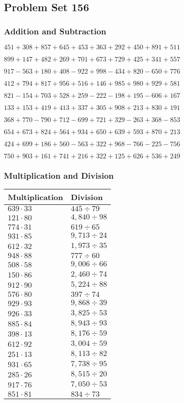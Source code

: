 \hypertarget{problem-set-156}{%
\subsection{Problem Set 156}\label{problem-set-156}}

\hypertarget{addition-and-subtraction}{%
\subsubsection{Addition and
Subtraction}\label{addition-and-subtraction}}

\(451 +308 +857 +645 +453 +363 +292 +450 +891 +511\)

\(899 +147 +482 +269 +701 +673 +729 +425 +341 +557\)

\(917 - 563 +180 +408 - 922 +998 - 434 +820 - 650 +776\)

\(412 +794 +817 +956 +516 +146 +985 +980 +929 +581\)

\(821 - 154 +703 +528 +259 - 222 - 198 +195 - 606 +167\)

\(133 +153 +419 +413 +337 +305 +908 +213 +830 +191\)

\(368 +770 - 790 +712 - 699 +721 +329 - 263 +368 - 853\)

\(654 +673 +824 +564 +934 +650 +639 +593 +870 +213\)

\(424 +699 +186 +560 - 563 +322 +968 - 766 - 225 - 756\)

\(750 +903 +161 +741 +216 +322 +125 +626 +536 +249\)

\hypertarget{multiplication-and-division}{%
\subsubsection{Multiplication and
Division}\label{multiplication-and-division}}

\begin{longtable}[]{@{}ll@{}}
\toprule
Multiplication & Division\tabularnewline
\midrule
\endhead
\(639 \cdot 33\) & \(445 ÷ 79\)\tabularnewline
\(121 \cdot 80\) & \(4,840÷98\)\tabularnewline
\(774 \cdot 31\) & \(619÷65\)\tabularnewline
\(931 \cdot 85\) & \(9,713÷24\)\tabularnewline
\(612 \cdot 32\) & \(1,973÷35\)\tabularnewline
\(948 \cdot 88\) & \(777÷60\)\tabularnewline
\(508 \cdot 58\) & \(9,006÷66\)\tabularnewline
\(150 \cdot 86\) & \(2,460÷74\)\tabularnewline
\(912 \cdot 90\) & \(5,224÷88\)\tabularnewline
\(576 \cdot 80\) & \(397 ÷ 74\)\tabularnewline
\(929 \cdot 93\) & \(9,868÷39\)\tabularnewline
\(926 \cdot 33\) & \(3,825÷53\)\tabularnewline
\(885 \cdot 84\) & \(8,943÷93\)\tabularnewline
\(398 \cdot 13\) & \(8,176÷59\)\tabularnewline
\(612 \cdot 92\) & \(3,004÷59\)\tabularnewline
\(251 \cdot 13\) & \(8,113÷82\)\tabularnewline
\(931 \cdot 65\) & \(7,738÷95\)\tabularnewline
\(285 \cdot 26\) & \(8,515÷20\)\tabularnewline
\(917 \cdot 76\) & \(7,050÷53\)\tabularnewline
\(851 \cdot 81\) & \(834÷73\)\tabularnewline
\bottomrule
\end{longtable}
